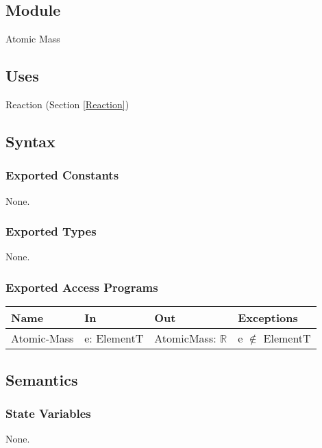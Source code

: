 \documentclass[12pt, titlepage]{article}
\begin{document}
\subsection{Module}

Atomic Mass

\subsection{Uses}

Reaction (Section \ref{Reaction})

\subsection{Syntax}

\subsubsection{Exported Constants}

None.

\subsubsection{Exported Types}

None.


\subsubsection{Exported Access Programs}

\begin{center}
\begin{tabular}{p{2cm} p{4cm} p{4cm} p{2cm}}
\hline
\textbf{Name} & \textbf{In} & \textbf{Out} & \textbf{Exceptions} \\
\hline
{Atomic-Mass} & e: ElementT & AtomicMass: $\mathbb{R}$ & e $\notin$ ElementT  \\
\hline
\end{tabular}
\end{center}

\subsection{Semantics}

\subsubsection{State Variables}

None.
\end{document}
